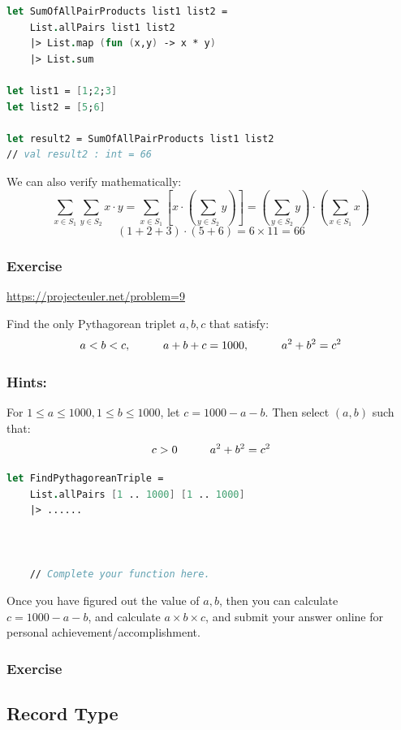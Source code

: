 \documentclass[12pt]{article}
\begin{document}
\begin{lstlisting}[language=FSharp]
let SumOfAllPairProducts list1 list2 =
    List.allPairs list1 list2
    |> List.map (fun (x,y) -> x * y)
    |> List.sum

let list1 = [1;2;3]
let list2 = [5;6]

let result2 = SumOfAllPairProducts list1 list2 
// val result2 : int = 66
\end{lstlisting}
We can also verify mathematically:
\[
\sum_{x \in S_1} \sum_{y \in S_2} x \cdot y = \sum_{x \in S_1} \left[x \cdot \left( \sum_{y \in S_2} y \right) \right] = \left(\sum_{y \in S_2} y \right) \cdot \left(\sum_{x \in S_1} x\right)
\]
\[
(1 + 2 + 3) \cdot (5 + 6) = 6 \times 11 = 66
\]
\subsubsection*{Exercise}
\url{https://projecteuler.net/problem=9}

Find the only Pythagorean triplet $a, b, c$ that satisfy:
\[
a < b < c, \hspace{1.0cm} a + b + c = 1000, \hspace{1.0cm} a^2 + b^2 = c^2
\]
\subsubsection*{Hints:} 
For $1 \leq a \leq 1000, 1 \leq b \leq 1000$, let  $c = 1000 - a - b$. Then select $(a,b)$ such that:
\[
c > 0 \hspace{1.0cm}a^2 + b^2 = c^2
\]
\begin{lstlisting}[language=FSharp]
let FindPythagoreanTriple =
    List.allPairs [1 .. 1000] [1 .. 1000]
    |> ......



    // Complete your function here.

\end{lstlisting}
Once you have figured out the value of $a, b$, then you can calculate $c = 1000 - a - b$, and calculate $a \times b \times c$, and submit your answer online for personal achievement/accomplishment.

\pagebreak

\subsubsection*{Exercise}
\subsection{Record Type}
\end{document}
